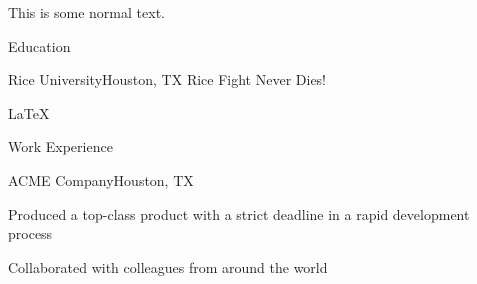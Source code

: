 \documentclass{resume-cwf}
\author{Carson Foster}
\begin{document}
\setlength{\parskip}{1em}
\makeinfo
This is some normal text.\\
\begin{rsection}{Education}
	\begin{rsubsection}{Rice University}{Houston, TX}
	Rice Fight Never Dies!\\
	\end{rsubsection}
	\LaTeX\\
\end{rsection}

\begin{rsection}{Work Experience}
	\begin{rsubsection}{ACME Company}{Houston, TX}
		\begin{*itemize}
		\item Produced a top-class product with a strict deadline in a rapid development process
		\item Collaborated with colleagues from around the world
		\end{*itemize}
	\end{rsubsection}
\end{rsection}
\end{document}
